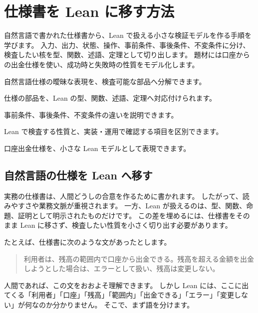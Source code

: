 \chapter{仕様書を Lean に移す方法}
\label{chap:spec-to-lean}

\begin{chapterabstract}
自然言語で書かれた仕様書から、Lean で扱える小さな検証モデルを作る手順を学びます。
入力、出力、状態、操作、事前条件、事後条件、不変条件に分け、検査したい核を型、関数、述語、定理として切り出します。
題材には口座からの出金仕様を使い、成功時と失敗時の性質をモデル化します。
\end{chapterabstract}

\begin{learninggoals}
\item 自然言語仕様の曖昧な表現を、検査可能な部品へ分解できます。
\item 仕様の部品を、Lean の型、関数、述語、定理へ対応付けられます。
\item 事前条件、事後条件、不変条件の違いを説明できます。
\item Lean で検査する性質と、実装・運用で確認する項目を区別できます。
\item 口座出金仕様を、小さな Lean モデルとして表現できます。
\end{learninggoals}

\section{自然言語の仕様を Lean へ移す}

実務の仕様書は、人間どうしの合意を作るために書かれます。
したがって、読みやすさや業務文脈が重視されます。
一方、Lean が扱えるのは、型、関数、命題、証明として明示されたものだけです。
この差を埋めるには、仕様書をそのまま Lean に移さず、検査したい性質を小さく切り出す必要があります。

たとえば、仕様書に次のような文があったとします。

\begin{quote}
利用者は、残高の範囲内で口座から出金できる。残高を超える金額を出金しようとした場合は、エラーとして扱い、残高は変更しない。
\end{quote}

人間であれば、この文をおおよそ理解できます。
しかし Lean には、ここに出てくる「利用者」「口座」「残高」「範囲内」「出金できる」「エラー」「変更しない」が何なのか分かりません。
そこで、まず語を分けます。

